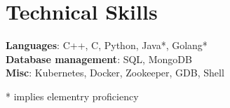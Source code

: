 \documentclass[letterpaper,11pt]{article}
\makeatletter
\newcommand{\resumeItem}[1]{
  \item\small{
    {#1 \vspace{-2pt}}
  }
}
\newcommand{\resumeSubheading}[4]{
  \vspace{-2pt}\item
    \begin{tabular*}{1.0\textwidth}[t]{l@{\extracolsep{\fill}}r}
      \textbf{#1} & \textbf{\small #2} \\
      \textit{\small#3} & \textit{\small #4} \\
    \end{tabular*}\vspace{-7pt}
}
\newcommand{\resumeSubHeadingListStart}{\begin{itemize}[leftmargin=0.0in, label={}]}
\newcommand{\resumeSubHeadingListEnd}{\end{itemize}}
\newcommand{\resumeItemListStart}{\begin{itemize}}
\newcommand{\resumeItemListEnd}{\end{itemize}\vspace{-5pt}}
\makeatother
\begin{document}
%
\section{Technical Skills}
 \begin{itemize}[leftmargin=0.15in, label={}]
    \small{\item{
     \textbf{Languages}{: C++, C, Python, Java*, Golang*} \\
     \textbf{Database management}{: SQL, MongoDB} \\
     \textbf{Misc}{: Kubernetes, Docker, Zookeeper, GDB, Shell} \\
    }}
 \end{itemize}
 * implies elementry proficiency
 \vspace{-16pt}


        
\end{document}
